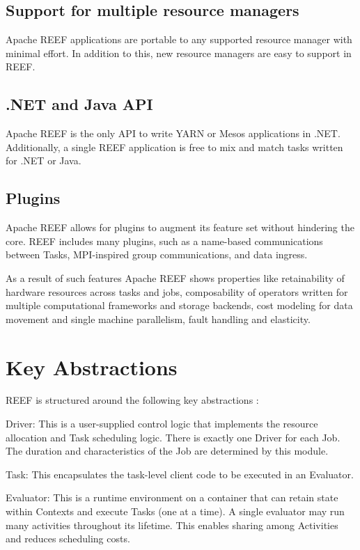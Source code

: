 \documentclass[9pt,twocolumn,twoside]{styles/osajnl}
\begin{document}
\subsection{Support for multiple resource managers}
Apache REEF applications are portable to any supported resource manager with minimal effort. In addition to this, new resource managers are easy to support in REEF.
\subsection{.NET and Java API}
Apache REEF is the only API to write YARN or Mesos applications in .NET. Additionally, a single REEF application is free to mix and match tasks written for .NET or Java.
\subsection{Plugins} 
Apache REEF allows for plugins to augment its feature set without hindering the core. REEF includes many plugins, such as a name-based communications between Tasks, MPI-inspired group communications, and data ingress. \newline

As a result of such features Apache REEF shows properties like retainability of hardware resources across tasks and  jobs, composability of operators  written for  multiple computational frameworks and storage backends, cost modeling for data movement and single machine parallelism, fault handling \cite{techopedia} and elasticity.

\section{Key Abstractions}

REEF is structured around the following key abstractions \cite{reefarticle}:

Driver: This is a user-supplied control logic that implements the resource allocation and Task scheduling logic. There is exactly one Driver for each Job. The duration and characteristics of the Job are determined by this module.

Task: This encapsulates the task-level client code to be executed in an Evaluator.

Evaluator: This is a runtime environment on a container that can retain state within Contexts and execute Tasks (one at a time). A single evaluator may run many activities throughout its lifetime. This enables sharing among Activities and reduces scheduling costs.
\end{document}

